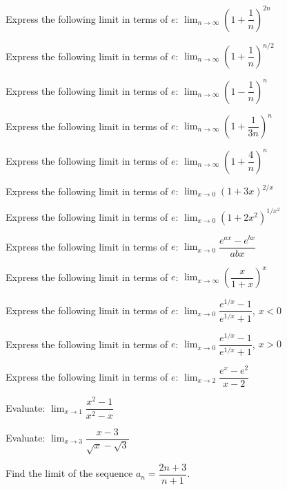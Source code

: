 \documentclass[11pt,a4paper]{article}
\begin{document}
\begin{shortlist}
\item Express the following limit in terms of $e$: $\displaystyle\lim_{n\to\infty}\left(1+\dfrac{1}{n}\right)^{2n}$

\item Express the following limit in terms of $e$: $\displaystyle\lim_{n\to\infty}\left(1+\dfrac{1}{n}\right)^{n/2}$

\item Express the following limit in terms of $e$: $\displaystyle\lim_{n\to\infty}\left(1-\dfrac{1}{n}\right)^{n}$

\item Express the following limit in terms of $e$: $\displaystyle\lim_{n\to\infty}\left(1+\dfrac{1}{3n}\right)^{n}$

\item Express the following limit in terms of $e$: $\displaystyle\lim_{n\to\infty}\left(1+\dfrac{4}{n}\right)^{n}$

\item Express the following limit in terms of $e$: $\displaystyle\lim_{x\to0}(1+3x)^{2/x}$

\item Express the following limit in terms of $e$: $\displaystyle\lim_{x\to0}(1+2x^2)^{1/x^2}$

\item Express the following limit in terms of $e$: $\displaystyle\lim_{x\to0}\dfrac{e^{ax}-e^{bx}}{abx}$

\item Express the following limit in terms of $e$: $\displaystyle\lim_{x\to\infty}\left(\dfrac{x}{1+x}\right)^{x}$

\item Express the following limit in terms of $e$: $\displaystyle\lim_{x\to0}\dfrac{e^{1/x}-1}{e^{1/x}+1}$, $x<0$

\item Express the following limit in terms of $e$: $\displaystyle\lim_{x\to0}\dfrac{e^{1/x}-1}{e^{1/x}+1}$, $x>0$

\item Express the following limit in terms of $e$: $\displaystyle\lim_{x\to2}\dfrac{e^x-e^2}{x-2}$

\item Evaluate: $\displaystyle\lim_{x\to1}\dfrac{x^2-1}{x^2-x}$

\item Evaluate: $\displaystyle\lim_{x\to3}\dfrac{x-3}{\sqrt{x}-\sqrt{3}}$

\item Find the limit of the sequence $a_n=\dfrac{2n+3}{n+1}$.


\end{shortlist}
\end{document}
